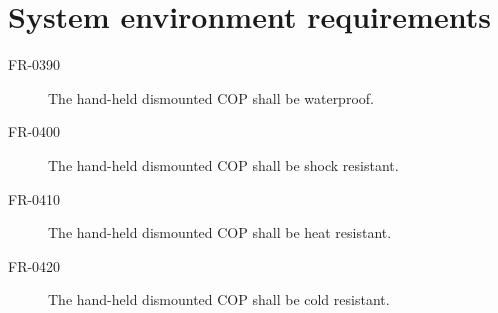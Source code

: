 \section{System environment requirements}

\begin{description}
\item[FR-0390] The hand-held dismounted COP shall be waterproof.
\item[FR-0400] The hand-held dismounted COP shall be shock resistant.
\item[FR-0410] The hand-held dismounted COP shall be heat resistant.
\item[FR-0420] The hand-held dismounted COP shall be cold resistant.
\end{description}